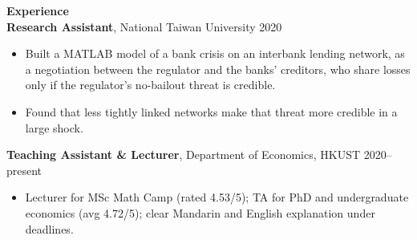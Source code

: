 \documentclass[11pt,letterpaper]{article}
\begin{document}
{\large \textbf{Experience}}\\[1pt]
\textbf{Research Assistant}, National Taiwan University \hfill 2020\\
\vspace{1pt}
\begin{itemize}
  \item Built a MATLAB model of a bank crisis on an interbank lending network, as a negotiation between the regulator and the banks' creditors, who share losses only if the regulator's no-bailout threat is credible.
  \item Found that less tightly linked networks make that threat more credible in a large shock.
\end{itemize}
\textbf{Teaching Assistant \& Lecturer}, Department of Economics, HKUST \hfill 2020--present\\
\vspace{1pt}
\begin{itemize}
  \item Lecturer for MSc Math Camp (rated 4.53/5); TA for PhD and undergraduate economics (avg 4.72/5); clear Mandarin and English explanation under deadlines.
\end{itemize}

\vspace{1pt}
\end{document}
